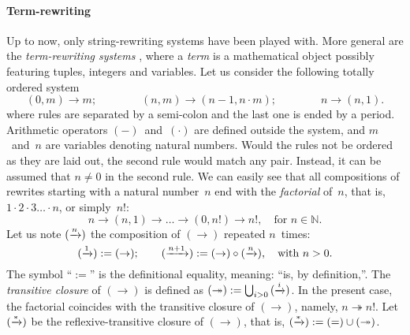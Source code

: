 \paragraph{Term-rewriting}

Up to now, only string\hyp{}rewriting systems have been played
with. More general are the \emph{term\hyp{}rewriting
  systems} \citep{BaaderNipkow_1998}, where a
\emph{term} is a mathematical object possibly featuring
tuples, integers and variables. Let us consider the following totally
ordered system
\begin{equation}
(0,m) \rightarrow m;\qquad\qquad
(n,m) \rightarrow (n-1,n \cdot m);\qquad\qquad
n     \rightarrow (n,1).
\label{eq:fact_tf}
\end{equation}
where rules are separated by a semi\hyp{}colon and the last one is
ended by a period. Arithmetic operators \((-)\)~and~\((\cdot)\) are
defined outside the system, and \(m\)~and~\(n\) are variables denoting
natural numbers. Would the rules not be ordered as they are laid out,
the second rule would match any pair. Instead, it can be assumed that
\(n \neq 0\) in the second rule. We can easily see that all
compositions of rewrites starting with a natural number~\(n\) end with
the \emph{factorial} of~\(n\), that is, \(1 \cdot 2
\cdot 3 \dots \cdot n\), or simply~\(n!\):
\begin{equation*}
n \rightarrow (n,1) \rightarrow \dots \rightarrow (0,n!) \rightarrow
n!, \quad \text{for \(n \in \mathbb{N}\)}.
\end{equation*}
Let us note \((\xrightarrow{\smash{n}})\) the composition of
\((\rightarrow)\) repeated \(n\)~times:
\begin{equation*}
  (\xrightarrow{\smash{1}})   := (\rightarrow);\qquad
  (\xrightarrow{\smash{n+1}}) :=
     (\rightarrow) \circ (\xrightarrow{\smash{n}}),
\quad \text{with \(n > 0\)}.
\end{equation*}
The symbol ``\(:=\)'' is the definitional equality, meaning: ``is, by
definition,''. The \emph{transitive closure} \label{transitive_closure} of \((\rightarrow)\) is defined
as \((\twoheadrightarrow) := \bigcup_{i >
  0}{(\xrightarrow{\smash{i}})}\). In the present case, the
factorial coincides with the transitive closure of
\((\rightarrow)\), namely, \(n \twoheadrightarrow n!\). Let
\((\xrightarrow{\smash{*}})\) be the reflexive\hyp{}transitive closure
of \((\rightarrow)\), that is, \((\xrightarrow{\smash{*}}) := (=) \cup
(\twoheadrightarrow)\).


